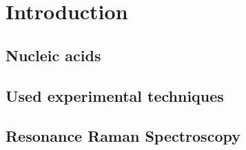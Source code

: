 \chapter{Introduction}

\section{Nucleic acids}

\section{Used experimental techniques}

\section{Resonance Raman Spectroscopy}
